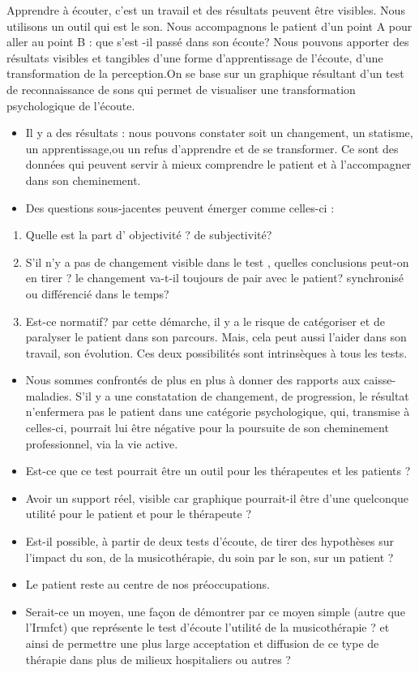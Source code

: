 \documentclass[12pt,french]{report}
\begin{document}
Apprendre à écouter, c'est un travail et des résultats peuvent être
visibles. Nous utilisons un outil qui est le son. Nous accompagnons
le patient d'un point A pour aller au point B : que s'est -il passé
dans son écoute? Nous pouvons apporter des résultats visibles et tangibles
d'une forme d'apprentissage de l'écoute, d'une transformation de la
perception.On se base sur un graphique résultant d'un test de reconnaissance
de sons qui permet de visualiser une transformation psychologique
de l'écoute. 
\begin{itemize}
\item Il y a des résultats : nous pouvons constater soit un changement,
un statisme, un apprentissage,ou un refus d'apprendre et de se transformer.
Ce sont des données qui peuvent servir à mieux comprendre le patient
et à l'accompagner dans son cheminement.
\item Des questions sous-jacentes peuvent émerger comme celles-ci :
\end{itemize}
\begin{enumerate}
\item Quelle est la part d' objectivité ? de subjectivité?
\item S'il n'y a pas de changement visible dans le test , quelles conclusions
peut-on en tirer ? le changement va-t-il toujours de pair avec le
patient? synchronisé ou différencié dans le temps?
\item Est-ce normatif? par cette démarche, il y a le risque de catégoriser
et de paralyser le patient dans son parcours. Mais, cela peut aussi
l'aider dans son travail, son évolution. Ces deux possibilités sont
intrinsèques à tous les tests.
\end{enumerate}
\begin{itemize}
\item Nous sommes confrontés de plus en plus à donner des rapports aux caisse-maladies.
S'il y a une constatation de changement, de progression, le résultat
n'enfermera pas le patient dans une catégorie psychologique, qui,
transmise à celles-ci, pourrait lui être négative pour la poursuite
de son cheminement professionnel, via la vie active. 
\item Est-ce que ce test pourrait être un outil pour les thérapeutes et
les patients ? 
\item Avoir un support réel, visible car graphique pourrait-il être d'une
quelconque utilité pour le patient et pour le thérapeute ?
\item Est-il possible, à partir de deux tests d'écoute, de tirer des hypothèses
sur l'impact du son, de la musicothérapie, du soin par le son, sur
un patient ?
\item Le patient reste au centre de nos préoccupations.
\item Serait-ce un moyen, une façon de démontrer par ce moyen simple (autre
que l'Irmfct) que représente le test d'écoute l'utilité de la musicothérapie
? et ainsi de permettre une plus large acceptation et diffusion de
ce type de thérapie dans plus de milieux hospitaliers ou autres ?
\end{itemize}
\end{document}
